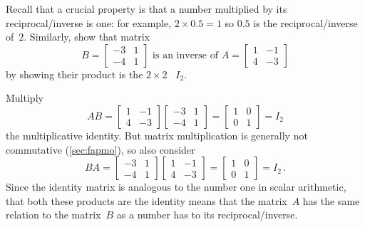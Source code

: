 \begin{example} \label{eg:a2x2inv}
Recall that a crucial property is that a number multiplied by its reciprocal\slash inverse is one: for example, \(2\times 0.5=1\) so \(0.5\) is the reciprocal\slash inverse of~\(2\).
Similarly, show that matrix 
\begin{equation*}
B=\begin{bmatrix} -3&1\\-4&1 \end{bmatrix}
\text{ is an inverse of }
A=\begin{bmatrix} 1&-1\\4&-3 \end{bmatrix}
\end{equation*}
by showing their product is the \(2\times2\) ~\(I_2\).
\begin{solution} 
Multiply 
\begin{equation*}
AB=\begin{bmatrix} 1&-1\\4&-3 \end{bmatrix}
\begin{bmatrix} -3&1\\-4&1 \end{bmatrix}
=\begin{bmatrix} 1&0\\0&1 \end{bmatrix}=I_2
\end{equation*}
the multiplicative identity.  
But matrix multiplication is generally not commutative (\cref{sec:fapmo}), so also consider
\begin{equation*}
BA=\begin{bmatrix} -3&1\\-4&1 \end{bmatrix}
\begin{bmatrix} 1&-1\\4&-3 \end{bmatrix}
=\begin{bmatrix} 1&0\\0&1 \end{bmatrix}=I_2\,.
\end{equation*}
Since the identity matrix is analogous to the number one in scalar arithmetic, that both these products are the identity means that the matrix~\(A\) has the same relation to the matrix~\(B\) as a number has to its reciprocal\slash inverse.


\end{solution}
\end{example}
